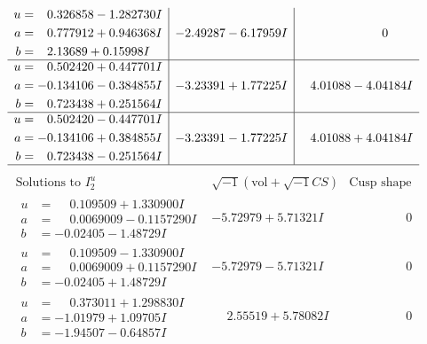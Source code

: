 \documentclass[1p]{elsarticle_modified}
\theoremstyle{definition}
\newcommand{\I}{\sqrt{-1}}
\begin{document}
$$\begin{array}{c|c|c}
\begin{aligned}
u &= \phantom{-}0.326858 - 1.282730 I \\
a &= \phantom{-}0.777912 + 0.946368 I \\
b &= \phantom{-}2.13689 + 0.15998 I\end{aligned}
 & -2.49287 - 6.17959 I & \phantom{-0.000000 } 0 \\ \hline\begin{aligned}
u &= \phantom{-}0.502420 + 0.447701 I \\
a &= -0.134106 - 0.384855 I \\
b &= \phantom{-}0.723438 + 0.251564 I\end{aligned}
 & -3.23391 + 1.77225 I & \phantom{-}4.01088 - 4.04184 I \\ \hline\begin{aligned}
u &= \phantom{-}0.502420 - 0.447701 I \\
a &= -0.134106 + 0.384855 I \\
b &= \phantom{-}0.723438 - 0.251564 I\end{aligned}
 & -3.23391 - 1.77225 I & \phantom{-}4.01088 + 4.04184 I\\
 \hline 
 \end{array}$$\newpage$$\begin{array}{c|c|c}  
\text{Solutions to }I^u_{2}& \I (\text{vol} + \sqrt{-1}CS) & \text{Cusp shape}\\
 \hline 
\begin{aligned}
u &= \phantom{-}0.109509 + 1.330900 I \\
a &= \phantom{-}0.0069009 - 0.1157290 I \\
b &= -0.02405 - 1.48729 I\end{aligned}
 & -5.72979 + 5.71321 I & \phantom{-0.000000 } 0 \\ \hline\begin{aligned}
u &= \phantom{-}0.109509 - 1.330900 I \\
a &= \phantom{-}0.0069009 + 0.1157290 I \\
b &= -0.02405 + 1.48729 I\end{aligned}
 & -5.72979 - 5.71321 I & \phantom{-0.000000 } 0 \\ \hline\begin{aligned}
u &= \phantom{-}0.373011 + 1.298830 I \\
a &= -1.01979 + 1.09705 I \\
b &= -1.94507 - 0.64857 I\end{aligned}
 & \phantom{-}2.55519 + 5.78082 I & \phantom{-0.000000 } 0 \\ \hline\begin{aligned}

\end{aligned}
\end{array}$$
\end{document}
